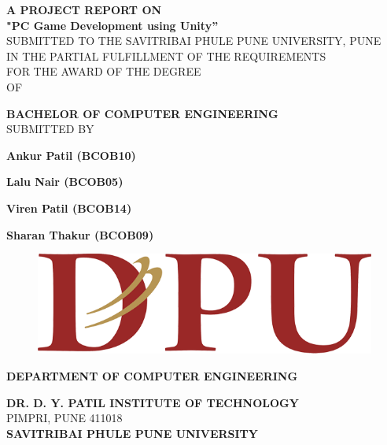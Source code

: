 \documentclass[12pt]{report}
\begin{document}
\centering \large \textbf  {A PROJECT REPORT ON}\\
\vspace{0.75 cm}
\Large \textbf{"PC Game Development using Unity”}\\
\vspace{0.5 cm}
\normalsize{SUBMITTED TO THE SAVITRIBAI PHULE PUNE UNIVERSITY, PUNE}\\
\normalsize{IN THE PARTIAL FULFILLMENT OF THE REQUIREMENTS}\\
\normalsize{  FOR THE AWARD OF THE DEGREE}\\
\vspace{0.75 cm}
\normalsize {OF}\\
\vspace{0.75 cm}

\Large\textbf{BACHELOR OF COMPUTER ENGINEERING}\\
\vspace{0.8 cm}
\large{SUBMITTED BY}\\
\vspace{0.3 cm}

\large \textbf  {Ankur Patil (BCOB10)}

\large \textbf  {Lalu Nair (BCOB05) }

\large \textbf {Viren Patil (BCOB14)}

\large \textbf {Sharan Thakur (BCOB09)}

\begin{figure}[h]
\centering
\includegraphics[scale=0.25]{Logo.png }
\end{figure}

\centering \Large \textbf  {DEPARTMENT OF COMPUTER ENGINEERING}\\
\vspace{0.4cm}

\large \textbf  {DR. D. Y. PATIL INSTITUTE OF TECHNOLOGY}\\
\normalsize {PIMPRI, PUNE 411018}\\
\vspace{0.2 cm}
\large \textbf{SAVITRIBAI PHULE PUNE UNIVERSITY}\\
\end{document}
